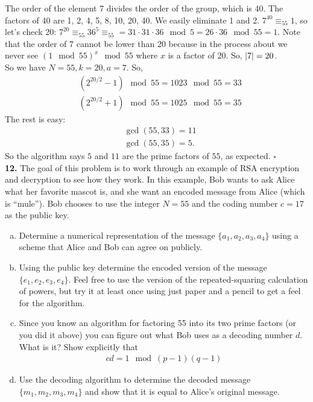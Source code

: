 \documentclass{book}
\theoremstyle{definition}
\newcommand{\nn}{\nonumber}
\newcommand{\lp}{\left(}
\newcommand{\rp}{\right)}
\begin{document}
The order of the element 7 divides the order of the group, which is 40. The factors of 40 are 1, 2, 4, 5, 8, 10, 20, 40. We easily eliminate 1 and 2. $7^{40} \equiv_{55} 1$, so let's check 20: $7^{20} \equiv_{55} 36^{5} \equiv_{55} = 31\cdot 31\cdot 36 \mod 5 = 26\cdot 36 \mod 55 = 1$. Note that the order of $7$ cannot be lower than 20 because in the process about we never see $(1\mod 55)^x\mod 55$ where $x$ is a factor of 20. So, $\abs{7} = 20$. \\

So we have $N=55, k = 20, a = 7$. So,
\begin{align}
&\lp 2^{20/2} - 1 \rp \mod 55 = 1023 \mod 55 = 33\nn\\
&\lp 2^{20/2} + 1 \rp \mod 55 = 1025 \mod 55 = 35
\end{align}
The rest is easy:
\begin{align}
&\gcd(55,33) = 11\nn\\
&\gcd(55,35) = 5.
\end{align}
So the algorithm says $5$ and $11$ are the prime factors of $55$, as expected. \hfill $\square$\\





\noindent \textbf{12.} The goal of this problem is to work through an example of RSA encryption and decryption to see how they work. In this example, Bob wants to ask Alice what her favorite mascot is, and she want an encoded message from Alice (which is ``mule''). Bob chooses to use the integer $N = 55$ and the coding number $c = 17$ as the public key.


\begin{enumerate}[(a)]
	\item  Determine a numerical representation of the message $\{a_1, a_2, a_3, a_4\}$ using a scheme that Alice and Bob can agree on publicly.
	
	\item  Using the public key determine the encoded version of the message $\{e_1, e_2, e_3, e_4\}$. Feel
	free to use the version of the repeated-squaring calculation of powers, but try it at least
	once using just paper and a pencil to get a feel for the algorithm.

	
	
	\item Since you know an algorithm for factoring 55 into its two prime factors (or you did it
	above) you can figure out what Bob uses as a decoding number $d$. What is it? Show explicitly that
	\begin{align}
	cd = 1 \mod (p-1)(q-1)
	\end{align}
	
	\item Use the decoding algorithm to determine the decoded message $\{m_1, m_2, m_3, m_4\}$ and
	show that it is equal to Alice's original message.
\end{enumerate}
\end{document}
